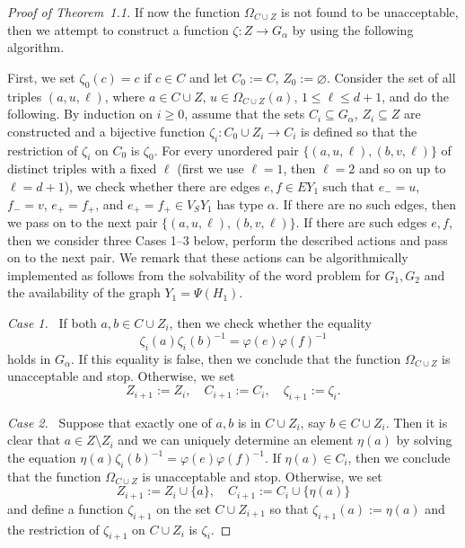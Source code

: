 \documentclass[10pt, reqno]{amsart}
\numberwithin{equation}{section}
\begin{document}
\begin{proof}[Proof of Theorem~1.1]
If now the function ${{\Omega}}_{C \cup Z}$ is not found to be unacceptable, then  we attempt to construct a function $\zeta : Z \to G_{\alpha}$ by using the following algorithm.

First, we set $\zeta_0(c)= c$ if $c \in C $  and let $C_0 := C$, $Z_0 := \varnothing$. Consider the set of all triples $(a, u, \ell)$, where $a \in C \cup Z$, $u \in  {{\Omega}}_{C \cup Z}(a)$, $1 \le \ell  \le d+1$, and do the following. By induction on $i \ge 0$, assume that the sets
$C_i \subseteq G_{\alpha}$, $Z_i \subseteq Z$ are constructed and a bijective function $\zeta_i : C_0 \cup Z_i \to C_i$ is  defined so that the restriction of $\zeta_i$ on $C_0$ is  $\zeta_0$. For every unordered pair
$\{ (a, u, \ell),  (b, v, \ell) \}$ of distinct triples with a fixed $\ell$ (first we use $\ell =1$, then $\ell =2$ and so on up to $\ell  = d+1$), we check whether there are edges $e , f \in EY_1$ such that $e_- = u$, $f_- = v$,  $e_+ = f_+$, and  $e_+ = f_+ \in V_SY_1$ has type ${\alpha}$.  If there are no such edges, then we pass on to the next pair
$\{ (a, u, \ell) ,  (b, v, \ell) \}$. If there are such edges $e, f$, then we consider three Cases 1--3 below, perform the described actions and pass on to the next pair. We remark that these actions can be
algorithmically implemented as follows from the solvability of the word problem for $G_1, G_2$ and the availability of the graph $Y_1 = \Psi(H_1)$.
\smallskip

{\em  Case 1.} \  If both $a, b \in C \cup Z_i$, then we check whether the equality
 $$
 \zeta_i(a) \zeta_i(b)^{-1} = {\varphi}(e) {\varphi}(f)^{-1}
 $$
 holds in $G_{\alpha}$. If this equality is false, then we conclude that the function  ${{\Omega}}_{C \cup Z}$ is  unacceptable and stop. Otherwise, we set
 $$
 Z_{i+1} := Z_{i} ,  \quad C_{i+1} := C_{i}  ,  \quad   \zeta_{i+1} := \zeta_{i} .
 $$
\smallskip

{\em  Case 2.} \  Suppose that exactly one of  $a, b$ is in $ C \cup Z_i$, say $b \in C \cup Z_i$. Then it is clear that
$a \in Z \setminus Z_i$ and  we can uniquely determine an element $\eta(a)$ by solving the equation
  $\eta(a) \zeta_i(b)^{-1} = {\varphi}(e) {\varphi}(f)^{-1} $. If $\eta(a) \in C_i$, then we conclude that the function  ${{\Omega}}_{C \cup Z}$ is  unacceptable and stop. Otherwise, we set
$$
Z_{i+1} := Z_{i}\cup \{ a \}  ,  \quad   C_{i+1} := C_{i}\cup \{ \eta(a) \}
$$
and define a function $\zeta_{i+1}$ on the set $C \cup Z_{i+1}$ so that  $\zeta_{i+1}(a) := \eta(a)$ and the restriction of  $\zeta_{i+1}$ on $C \cup Z_{i}$ is $\zeta_{i}$.
\smallskip


\end{proof}
\end{document}
